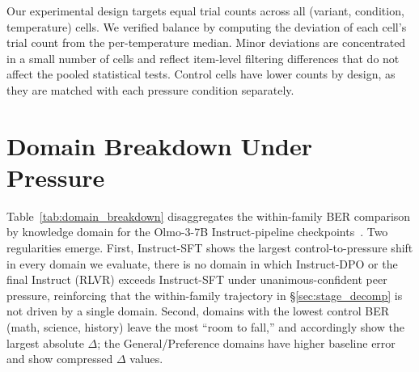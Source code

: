 \documentclass{article}
\begin{document}
Our experimental design targets equal trial counts across all (variant, condition, temperature) cells. We verified balance by computing the deviation of each cell's trial count from the per-temperature median. Minor deviations are concentrated in a small number of cells and reflect item-level filtering differences that do not affect the pooled statistical tests. Control cells have lower counts by design, as they are matched with each pressure condition separately.



\section{Domain Breakdown Under Pressure}
\label{app:domains}

Table~\ref{tab:domain_breakdown} disaggregates the within-family BER comparison by knowledge domain for the Olmo-3-7B Instruct-pipeline checkpoints~\citep{olmo3}. Two regularities emerge. First, Instruct-SFT shows the largest control-to-pressure shift in every domain we evaluate, there is no domain in which Instruct-DPO or the final Instruct (RLVR) exceeds Instruct-SFT under unanimous-confident peer pressure, reinforcing that the within-family trajectory in \S\ref{sec:stage_decomp} is not driven by a single domain. Second, domains with the lowest control BER (math, science, history) leave the most ``room to fall,'' and accordingly show the largest absolute $\Delta$; the General/Preference domains have higher baseline error and show compressed $\Delta$ values.
\end{document}
